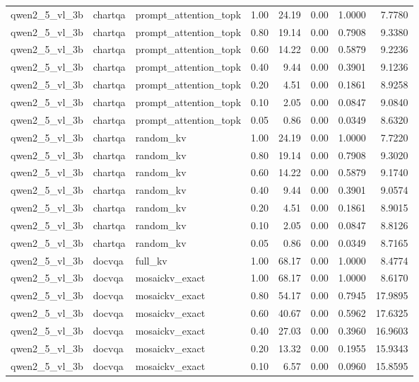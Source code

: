 \begin{longtable}{lllrrrrr}
qwen2\_5\_vl\_3b & chartqa & prompt\_attention\_topk & 1.00 & 24.19 & 0.00 & 1.0000 & 7.7780 \\
qwen2\_5\_vl\_3b & chartqa & prompt\_attention\_topk & 0.80 & 19.14 & 0.00 & 0.7908 & 9.3380 \\
qwen2\_5\_vl\_3b & chartqa & prompt\_attention\_topk & 0.60 & 14.22 & 0.00 & 0.5879 & 9.2236 \\
qwen2\_5\_vl\_3b & chartqa & prompt\_attention\_topk & 0.40 & 9.44 & 0.00 & 0.3901 & 9.1236 \\
qwen2\_5\_vl\_3b & chartqa & prompt\_attention\_topk & 0.20 & 4.51 & 0.00 & 0.1861 & 8.9258 \\
qwen2\_5\_vl\_3b & chartqa & prompt\_attention\_topk & 0.10 & 2.05 & 0.00 & 0.0847 & 9.0840 \\
qwen2\_5\_vl\_3b & chartqa & prompt\_attention\_topk & 0.05 & 0.86 & 0.00 & 0.0349 & 8.6320 \\
qwen2\_5\_vl\_3b & chartqa & random\_kv & 1.00 & 24.19 & 0.00 & 1.0000 & 7.7220 \\
qwen2\_5\_vl\_3b & chartqa & random\_kv & 0.80 & 19.14 & 0.00 & 0.7908 & 9.3020 \\
qwen2\_5\_vl\_3b & chartqa & random\_kv & 0.60 & 14.22 & 0.00 & 0.5879 & 9.1740 \\
qwen2\_5\_vl\_3b & chartqa & random\_kv & 0.40 & 9.44 & 0.00 & 0.3901 & 9.0574 \\
qwen2\_5\_vl\_3b & chartqa & random\_kv & 0.20 & 4.51 & 0.00 & 0.1861 & 8.9015 \\
qwen2\_5\_vl\_3b & chartqa & random\_kv & 0.10 & 2.05 & 0.00 & 0.0847 & 8.8126 \\
qwen2\_5\_vl\_3b & chartqa & random\_kv & 0.05 & 0.86 & 0.00 & 0.0349 & 8.7165 \\
qwen2\_5\_vl\_3b & docvqa & full\_kv & 1.00 & 68.17 & 0.00 & 1.0000 & 8.4774 \\
qwen2\_5\_vl\_3b & docvqa & mosaickv\_exact & 1.00 & 68.17 & 0.00 & 1.0000 & 8.6170 \\
qwen2\_5\_vl\_3b & docvqa & mosaickv\_exact & 0.80 & 54.17 & 0.00 & 0.7945 & 17.9895 \\
qwen2\_5\_vl\_3b & docvqa & mosaickv\_exact & 0.60 & 40.67 & 0.00 & 0.5962 & 17.6325 \\
qwen2\_5\_vl\_3b & docvqa & mosaickv\_exact & 0.40 & 27.03 & 0.00 & 0.3960 & 16.9603 \\
qwen2\_5\_vl\_3b & docvqa & mosaickv\_exact & 0.20 & 13.32 & 0.00 & 0.1955 & 15.9343 \\
qwen2\_5\_vl\_3b & docvqa & mosaickv\_exact & 0.10 & 6.57 & 0.00 & 0.0960 & 15.8595 \\

\end{longtable}
